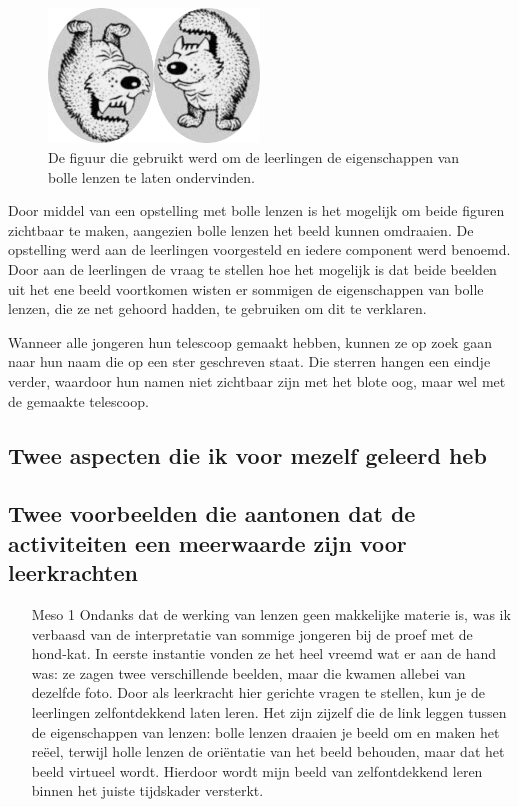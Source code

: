 \documentclass[a4paper,12pt,twoside]{article}%
\begin{document}
	\begin{figure}[!b]
		\centering
		\includegraphics[width=0.5\textwidth]{HondKat}
		\caption{De figuur die gebruikt werd om de  leerlingen de eigenschappen van bolle lenzen te laten ondervinden.}
		\label{Fig::HondKat}
	\end{figure}
	Door middel van een opstelling met bolle lenzen is het mogelijk om beide figuren zichtbaar te maken, aangezien bolle lenzen het beeld kunnen omdraaien. De opstelling werd aan de leerlingen voorgesteld en iedere component werd benoemd. Door aan de  leerlingen de vraag te stellen hoe het mogelijk is dat beide beelden uit het ene beeld voortkomen wisten er sommigen de eigenschappen van bolle lenzen, die ze net gehoord hadden, te gebruiken om dit te verklaren. 
	
	Wanneer alle jongeren hun telescoop gemaakt hebben, kunnen ze op zoek gaan naar hun naam die op een ster geschreven staat. Die sterren hangen een eindje verder, waardoor hun namen niet zichtbaar zijn met het blote oog, maar wel met de gemaakte telescoop. 
	
	\subsection{Twee aspecten die ik voor mezelf geleerd heb}
	
	\subsection{Twee voorbeelden die aantonen dat de activiteiten een meerwaarde zijn voor leerkrachten}
	\begin{itemize}[labelwidth=3em,leftmargin =\dimexpr{}+\relax]
		\item[Meso 1] Ondanks dat de werking van lenzen geen makkelijke materie is, was ik verbaasd van de interpretatie van sommige jongeren bij de proef met de hond-kat. In eerste instantie vonden ze het heel vreemd wat er aan de hand was: ze zagen twee verschillende beelden, maar die kwamen allebei van dezelfde foto. Door als leerkracht hier gerichte vragen te stellen, kun je de leerlingen zelfontdekkend laten leren. Het zijn zijzelf die de link leggen tussen de eigenschappen van lenzen: bolle lenzen draaien je beeld om en maken het reëel, terwijl holle lenzen de oriëntatie van het beeld behouden, maar dat het beeld virtueel wordt. Hierdoor wordt mijn beeld van zelfontdekkend leren  binnen het juiste tijdskader versterkt.
	\end{itemize}
	
\end{document}
